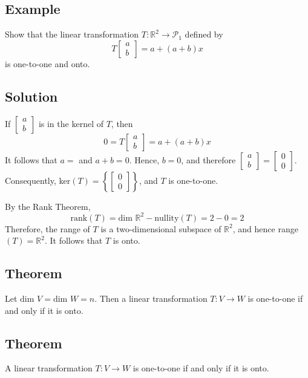 \subsection*{Example}
Show that the linear transformation $T:\mathbb{R}^2\to\mathscr{P}_1$ defined by
\[T\begin{bmatrix}
        a \\b
    \end{bmatrix}=a+(a+b)x\]
is one-to-one and onto.

\subsection*{Solution}
If $\begin{bmatrix}
        a \\b
    \end{bmatrix}$ is in the kernel of $T$, then
\[0=T\begin{bmatrix}
        a \\b
    \end{bmatrix}=a+(a+b)x\]
It follows that $a=$ and $a+b=0$. Hence, $b=0$, and therefore $\begin{bmatrix}
        a \\b
    \end{bmatrix}=\begin{bmatrix}
        0 \\0
    \end{bmatrix}$. Consequently, ker$(T)=\left\{\begin{bmatrix}
        0 \\0
    \end{bmatrix}\right\}$, and $T$ is one-to-one.

By the Rank Theorem,
\[\text{rank}(T)=\text{dim }\mathbb{R}^2-\text{nullity}(T)=2-0=2\]
Therefore, the range of $T$ is a two-dimensional subspace of $\mathbb{R}^2$, and hence
range$(T)=\mathbb{R}^2$. It follows that $T$ is onto.

\subsection*{Theorem}
Let $\text{dim } V = \text{dim } W = n$. Then a linear transformation $T: V\to W$ is
one-to-one if and only if it is onto.

\subsection*{Theorem}
A linear transformation $T: V\to W$ is one-to-one if and only if it is onto.

